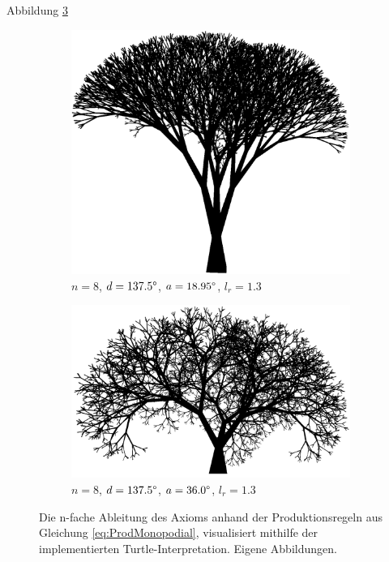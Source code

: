 Abbildung \ref{fig:Monopodial}

\begin{figure} [hbtp]
	\centering
	\begin{subfigure}[t]{.7\textwidth}
		\centering
		\includegraphics[width=\linewidth]{images/3DTreeP61B_Angle_18_95.png}
		\caption{$n=8$, $d=137.5\degree$, $a=18.95\degree$, $l_r=1.3$}
		\label{subfig:3DTreeP61B_Angle_18_95}
	\end{subfigure}
	\begin{subfigure}[t]{.7\textwidth}
		\centering
		\includegraphics[width=\linewidth]{images/3DTreeP61B_Angle_36.png}
		\caption{$n=8$, $d=137.5\degree$, $a=36.0\degree$, $l_r=1.3$}
		\label{subfig:3DTreeP61B_Angle_36}
	\end{subfigure}
	\caption{Die n-fache Ableitung des Axioms anhand der Produktionsregeln aus Gleichung \ref{eq:ProdMonopodial}, visualisiert mithilfe der implementierten Turtle-Interpretation. Eigene Abbildungen.}
	\label{fig:Monopodial}
\end{figure}

